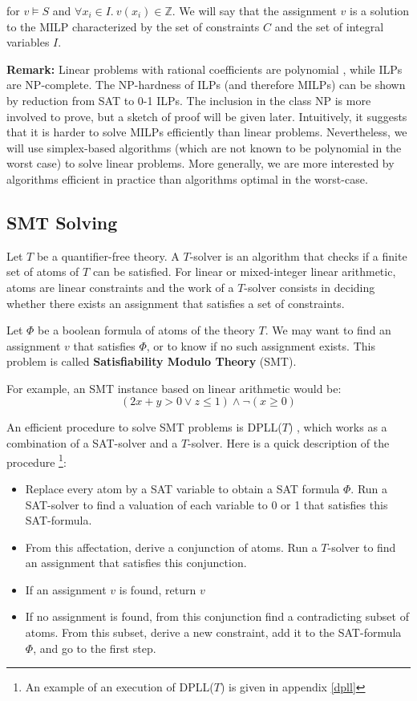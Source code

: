 \documentclass{article}
\newcommand{\ints}{\mathbb{Z}}
\begin{document}
for $v \vDash S$
and $\forall x_i \in I.~v(x_i) \in \ints$. We will say that the assignment $v$
is a solution to the MILP characterized by the set of constraints $C$ and the
set of integral variables $I$.

\textbf{Remark:} Linear problems with rational coefficients are
polynomial \cite[Section 13, 18]{Schrijver1998}, while ILPs are NP-complete.
The NP-hardness of ILPs (and therefore MILPs)
can be shown by reduction from SAT to 0-1 ILPs. The
inclusion in the class NP is more involved to prove, but a sketch of proof will
be given later.
Intuitively, it suggests that it is harder to solve MILPs efficiently than
linear problems. Nevertheless, we will use simplex-based algorithms (which are
not known to be polynomial in the worst case) to solve linear problems. More
generally, we are more interested by algorithms efficient in practice than
algorithms optimal in the worst-case.


\subsection{SMT Solving}
\label{smt}
Let $T$ be a quantifier-free theory. A $T$-solver is an algorithm that checks
if a finite set of atoms of $T$ can be satisfied. For linear or mixed-integer
linear arithmetic, atoms are linear constraints and the work of a $T$-solver
consists in deciding whether there exists an assignment
that satisfies a set of constraints.

Let $\Phi$ be a boolean formula of atoms of the theory $T$. We may want to find
an assignment $v$ that satisfies $\Phi$, or to know if no such assignment
exists. This problem is called \textbf{Satisfiability Modulo Theory} (SMT).

For example, an SMT instance based on linear arithmetic would be:
$$(2x + y > 0 \vee z \leqslant 1) \wedge \neg (x \geqslant 0)$$

An efficient procedure to solve SMT problems is DPLL($T$)
\cite[Section 3.2]{Decision2016},
which works as a combination of a SAT-solver and a $T$-solver. Here is a quick
description of the procedure
\footnote{An example of an execution of DPLL($T$) is given in appendix
\ref{dpll}}:

\begin{itemize}
  \item Replace every atom by a SAT variable to obtain a SAT formula $\Phi$.
    Run a SAT-solver to find a valuation of each variable to 0 or 1 that
    satisfies this SAT-formula.
  \item From this affectation, derive a conjunction of atoms. Run a
    $T$-solver to find an assignment that satisfies this conjunction.
  \item If an assignment $v$ is found, return $v$
  \item If no assignment is found, from this conjunction find a contradicting
    subset of atoms. From this subset, derive a new constraint, add it to the
    SAT-formula $\Phi$, and go to the first step.
\end{itemize}
\end{document}

